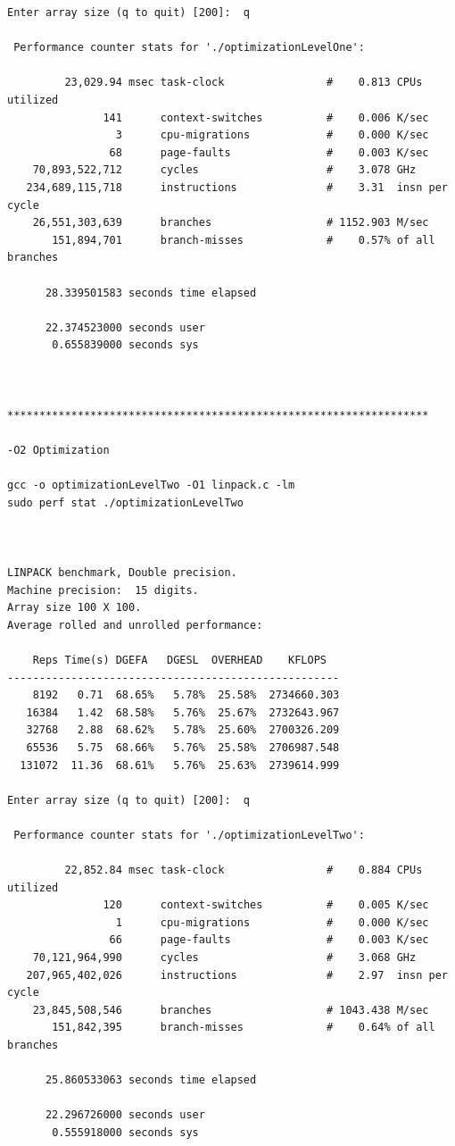 \documentclass[twocolumn]{article}
\begin{document}
\begin{verbatim}
Enter array size (q to quit) [200]:  q 

 Performance counter stats for './optimizationLevelOne':

         23,029.94 msec task-clock                #    0.813 CPUs utilized          
               141      context-switches          #    0.006 K/sec                  
                 3      cpu-migrations            #    0.000 K/sec                  
                68      page-faults               #    0.003 K/sec                  
    70,893,522,712      cycles                    #    3.078 GHz                    
   234,689,115,718      instructions              #    3.31  insn per cycle         
    26,551,303,639      branches                  # 1152.903 M/sec                  
       151,894,701      branch-misses             #    0.57% of all branches        

      28.339501583 seconds time elapsed

      22.374523000 seconds user
       0.655839000 seconds sys



******************************************************************

-O2 Optimization 

gcc -o optimizationLevelTwo -O1 linpack.c -lm
sudo perf stat ./optimizationLevelTwo 



LINPACK benchmark, Double precision.
Machine precision:  15 digits.
Array size 100 X 100.
Average rolled and unrolled performance:

    Reps Time(s) DGEFA   DGESL  OVERHEAD    KFLOPS
----------------------------------------------------
    8192   0.71  68.65%   5.78%  25.58%  2734660.303
   16384   1.42  68.58%   5.76%  25.67%  2732643.967
   32768   2.88  68.62%   5.78%  25.60%  2700326.209
   65536   5.75  68.66%   5.76%  25.58%  2706987.548
  131072  11.36  68.61%   5.76%  25.63%  2739614.999

Enter array size (q to quit) [200]:  q

 Performance counter stats for './optimizationLevelTwo':

         22,852.84 msec task-clock                #    0.884 CPUs utilized          
               120      context-switches          #    0.005 K/sec                  
                 1      cpu-migrations            #    0.000 K/sec                  
                66      page-faults               #    0.003 K/sec                  
    70,121,964,990      cycles                    #    3.068 GHz                    
   207,965,402,026      instructions              #    2.97  insn per cycle         
    23,845,508,546      branches                  # 1043.438 M/sec                  
       151,842,395      branch-misses             #    0.64% of all branches        

      25.860533063 seconds time elapsed

      22.296726000 seconds user
       0.555918000 seconds sys



\end{verbatim}
\end{document}
